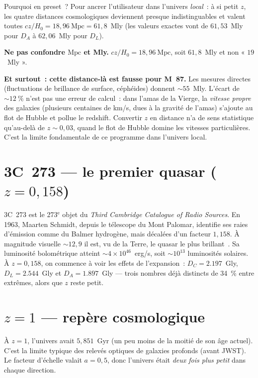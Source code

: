 \documentclass[11pt,a4paper,openany]{report}
\newcommand{\Mpc}{\text{Mpc}}
\newcommand{\Hzero}{H_{0}}
\begin{document}
Pourquoi en preset~? Pour ancrer l'utilisateur dans l'univers \emph{local}~:
à si petit $z$, les quatre distances cosmologiques deviennent presque
indistinguables et valent toutes $cz/\Hzero = 18{,}96~\Mpc = 61{,}8$~Mly
(les valeurs exactes vont de $61{,}53$~Mly pour $D_{A}$ à $62{,}06$~Mly pour
$D_{L}$).

\begin{tcolorbox}[attention]
\textbf{Ne pas confondre $\Mpc$ et Mly.} $cz/\Hzero = 18{,}96~\Mpc$, soit
$61{,}8$~Mly et non « $19$~Mly ».

\medskip
\textbf{Et surtout~: cette distance-là est fausse pour M~87.} Les mesures
directes (fluctuations de brillance de surface, céphéides) donnent
$\sim 55$~Mly. L'écart de $\sim 12~\%$ n'est pas une erreur de calcul~: dans
l'amas de la Vierge, la \emph{vitesse propre} des galaxies (plusieurs centaines
de km/s, dues à la gravité de l'amas) s'ajoute au flot de Hubble et pollue le
redshift. Convertir $z$ en distance n'a de sens statistique qu'au-delà de
$z \sim 0{,}03$, quand le flot de Hubble domine les vitesses particulières.
C'est la limite fondamentale de ce programme dans l'univers local.
\end{tcolorbox}

\section{3C~273 --- le premier quasar ($z = 0{,}158$)}

3C~273 est le 273$^{\text{e}}$ objet du \emph{Third Cambridge Catalogue of
Radio Sources}. En 1963, Maarten Schmidt, depuis le télescope du Mont Palomar,
identifie ses raies d'émission comme du Balmer hydrogène, mais décalées d'un
facteur $1{,}158$. À magnitude visuelle $\sim 12{,}9$ il est, vu de la Terre,
le quasar le plus brillant~\cite{Schmidt1963}. Sa luminosité bolométrique
atteint $\sim 4\times 10^{46}$~erg/s, soit $\sim 10^{13}$ luminosités solaires.
À $z=0{,}158$, on commence à voir les effets de l'expansion~:
$D_{C} = \num{2.197}$~Gly, $D_{L} = \num{2.544}$~Gly et
$D_{A} = \num{1.897}$~Gly --- trois nombres déjà distincts de 34~\% entre
extrêmes, alors que $z$ reste petit.

\section{$z = 1$ --- repère cosmologique}

À $z=1$, l'univers avait $5{,}851$~Gyr (un peu moins de la moitié de
son âge actuel). C'est la limite typique des relevés optiques de galaxies
profonds (avant JWST). Le facteur d'échelle valait $a = 0{,}5$, donc l'univers
était \emph{deux fois plus petit} dans chaque direction.
\end{document}
